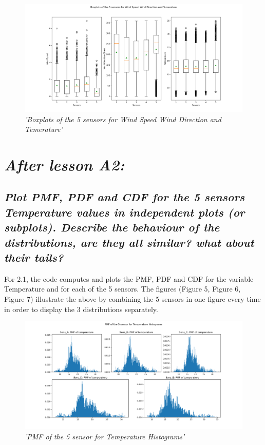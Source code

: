 \documentclass[a4paper,12pt]{article} %
\begin{document}
\begin{figure}[H]
\centering
\includegraphics[width=\textwidth]{Graphs/Boxplots_of_the_5_sensors_for_Temerature,_Wind_Speed_and_Wind_Direction.png}
\caption{\it'Boxplots of the 5 sensors for Wind Speed Wind Direction and Temerature'}
\end{figure}




\section{\it After lesson A2:}
\subsection{\it Plot PMF, PDF and CDF for the 5 sensors Temperature values in independent plots (or subplots). Describe the behaviour of the distributions, are they all similar? what about their tails?}



For 2.1, the code computes and plots the PMF, PDF and 
CDF for the variable Temperature and for each of the 5 sensors. 
The figures (Figure 5, Figure 6, Figure 7) illustrate the above by combining the 5 sensors
in one figure every time in order to display the 3 distributions separately.



\begin{figure}[H]
\centering
\includegraphics[width=\textwidth]{Graphs/PMF_of_the_5_sensor_-_Temperature_Histogram.png}
\caption{\it'PMF of the 5 sensor for Temperature Histograms'}
\end{figure}
\end{document}
